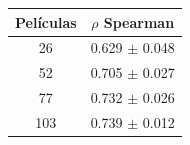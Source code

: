 \begin{tabular}{cc}
\toprule
Películas & $\rho$ Spearman \\
\midrule
26 & 0.629 $\pm$ 0.048 \\
52 & 0.705 $\pm$ 0.027 \\
77 & 0.732 $\pm$ 0.026 \\
103 & 0.739 $\pm$ 0.012 \\
\bottomrule
\end{tabular}
